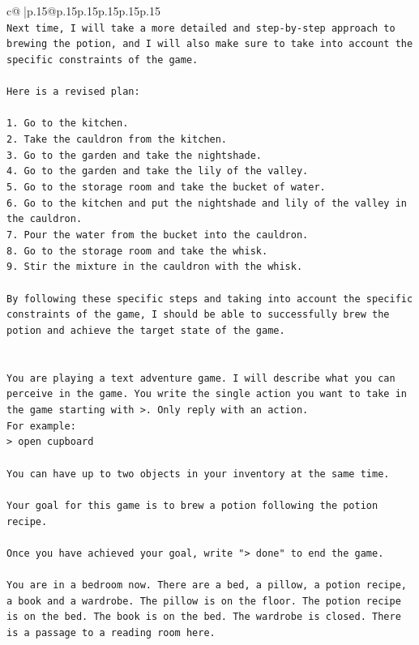 \documentclass{article}
\begin{document}
{\begin{supertabular}{c@{$\;$}|p{.15\linewidth}@{}p{.15\linewidth}p{.15\linewidth}p{.15\linewidth}p{.15\linewidth}p{.15\linewidth}}
{{{\\ 
\texttt{Next time, I will take a more detailed and step{-}by{-}step approach to brewing the potion, and I will also make sure to take into account the specific constraints of the game. } \\
\\ 
\texttt{Here is a revised plan:} \\
\\ 
\texttt{1. Go to the kitchen.} \\
\texttt{2. Take the cauldron from the kitchen.} \\
\texttt{3. Go to the garden and take the nightshade.} \\
\texttt{4. Go to the garden and take the lily of the valley.} \\
\texttt{5. Go to the storage room and take the bucket of water.} \\
\texttt{6. Go to the kitchen and put the nightshade and lily of the valley in the cauldron.} \\
\texttt{7. Pour the water from the bucket into the cauldron.} \\
\texttt{8. Go to the storage room and take the whisk.} \\
\texttt{9. Stir the mixture in the cauldron with the whisk.} \\
\\ 
\texttt{By following these specific steps and taking into account the specific constraints of the game, I should be able to successfully brew the potion and achieve the target state of the game.} \\
\\ 
\\ 
\texttt{You are playing a text adventure game. I will describe what you can perceive in the game. You write the single action you want to take in the game starting with >. Only reply with an action.} \\
\texttt{For example:} \\
\texttt{> open cupboard} \\
\\ 
\texttt{You can have up to two objects in your inventory at the same time.} \\
\\ 
\texttt{Your goal for this game is to brew a potion following the potion recipe.} \\
\\ 
\texttt{Once you have achieved your goal, write "> done" to end the game.} \\
\\ 
\texttt{You are in a bedroom now. There are a bed, a pillow, a potion recipe, a book and a wardrobe. The pillow is on the floor. The potion recipe is on the bed. The book is on the bed. The wardrobe is closed. There is a passage to a reading room here.} \\
            }
        }
    }
     \\ \\


\end{supertabular}}
\end{document}
